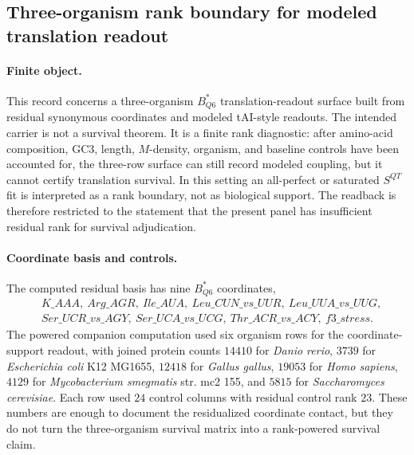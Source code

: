 \subsection{Three-organism rank boundary for modeled translation readout}
\label{sec:q6-three-organism-rank-degenerate-translation-survival-refusal-cross-layer}

\paragraph{Finite object.}
This record concerns a three-organism $B^*_{Q6}$ translation-readout surface built from residual synonymous coordinates and modeled tAI-style readouts.  The intended carrier is not a survival theorem.  It is a finite rank diagnostic: after amino-acid composition, GC3, length, $M$-density, organism, and baseline controls have been accounted for, the three-row surface can still record modeled coupling, but it cannot certify translation survival.  In this setting an all-perfect or saturated $S^{QT}$ fit is interpreted as a rank boundary, not as biological support.  The readback is therefore restricted to the statement that the present panel has insufficient residual rank for survival adjudication.

\paragraph{Coordinate basis and controls.}
The computed residual basis has nine $B^*_{Q6}$ coordinates,
$$
\begin{aligned}
&K\_AAA,\ Arg\_AGR,\ Ile\_AUA,\ Leu\_CUN\_vs\_UUR,\ Leu\_UUA\_vs\_UUG,\\
&Ser\_UCR\_vs\_AGY,\ Ser\_UCA\_vs\_UCG,\ Thr\_ACR\_vs\_ACY,\ f3\_stress.
\end{aligned}
$$
The powered companion computation used six organism rows for the coordinate-support readout, with joined protein counts $14410$ for \emph{Danio rerio}, $3739$ for \emph{Escherichia coli} K12 MG1655, $12418$ for \emph{Gallus gallus}, $19053$ for \emph{Homo sapiens}, $4129$ for \emph{Mycobacterium smegmatis} str. mc2 155, and $5815$ for \emph{Saccharomyces cerevisiae}.  Each row used $24$ control columns with residual control rank $23$.  These numbers are enough to document the residualized coordinate contact, but they do not turn the three-organism survival matrix into a rank-powered survival claim.

